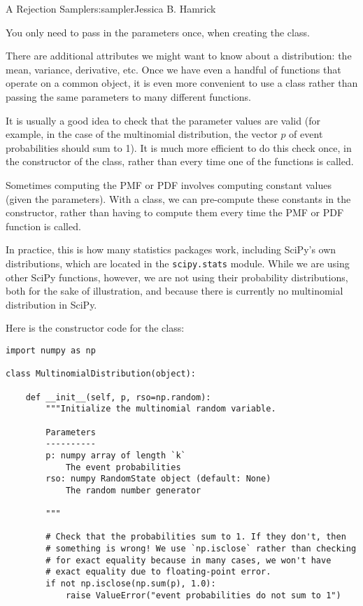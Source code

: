 \begin{aosachapter}{A Rejection Sampler}{s:sampler}{Jessica B. Hamrick}
\begin{aosaenumerate}
\item
  You only need to pass in the parameters once, when creating the class.
\item
  There are additional attributes we might want to know about a
  distribution: the mean, variance, derivative, etc. Once we have even a
  handful of functions that operate on a common object, it is even more
  convenient to use a class rather than passing the same parameters to
  many different functions.
\item
  It is usually a good idea to check that the parameter values are valid
  (for example, in the case of the multinomial distribution, the vector
  $p$ of event probabilities should sum to 1). It is much more efficient
  to do this check once, in the constructor of the class, rather than
  every time one of the functions is called.
\item
  Sometimes computing the PMF or PDF involves computing constant values
  (given the parameters). With a class, we can pre-compute these
  constants in the constructor, rather than having to compute them every
  time the PMF or PDF function is called.
\end{aosaenumerate}

In practice, this is how many statistics packages work, including
SciPy's own distributions, which are located in the \texttt{scipy.stats}
module. While we are using other SciPy functions, however, we are not
using their probability distributions, both for the sake of
illustration, and because there is currently no multinomial distribution
in SciPy.

Here is the constructor code for the class:

\begin{verbatim}
import numpy as np

class MultinomialDistribution(object):

    def __init__(self, p, rso=np.random):
        """Initialize the multinomial random variable.

        Parameters
        ----------
        p: numpy array of length `k`
            The event probabilities
        rso: numpy RandomState object (default: None)
            The random number generator

        """

        # Check that the probabilities sum to 1. If they don't, then
        # something is wrong! We use `np.isclose` rather than checking
        # for exact equality because in many cases, we won't have
        # exact equality due to floating-point error.
        if not np.isclose(np.sum(p), 1.0):
            raise ValueError("event probabilities do not sum to 1")


\end{verbatim}
\end{aosachapter}
